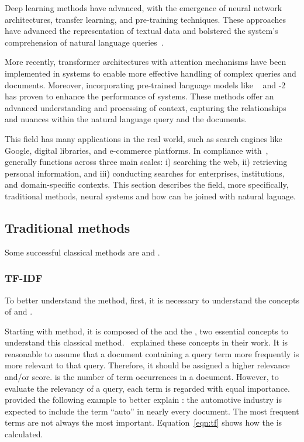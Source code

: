 Deep learning methods have advanced, with the emergence of neural network architectures, transfer learning, and pre-training techniques. These approaches have advanced the representation of textual data and bolstered the {\ir} system's comprehension of natural language queries~\cite{mitra_introduction_nodate}.

More recently, transformer architectures with attention mechanisms have been implemented in {\ir} systems to enable more effective handling of complex queries and documents. Moreover, incorporating pre-trained language models like {\bert}~\cite{devlin_bert_2018} and {\gpt}-2 has proven to enhance the performance of {\ir} systems. These methods offer an advanced understanding and processing of context, capturing the relationships and nuances within the natural language query and the documents.

This field has many applications in the real world, such as search engines like Google, digital libraries, and e-commerce platforms. In compliance with~\citet{p_m_efficient_2021}, {\ir} generally functions across three main scales: i) searching the web, ii) retrieving personal information, and iii) conducting searches for enterprises, institutions, and domain-specific contexts. This section describes the {\ir} field, more specifically, traditional methods, neural {\ir} systems and how {\ir} can be joined with natural laguage.


\subsection{Traditional methods}

Some successful classical methods are {\tfidf} and {\bm}.

\subsubsection{TF-IDF}

To better understand the {\tfidf} method, first, it is necessary to understand the concepts of {\tf} and {\idf}.

Starting with {\tfidf} method, it is composed of the {\tf} and the {\idf}, two essential concepts to understand this classical {\ir} method.~\citet{liang_research_2022} explained these concepts in their work. It is reasonable to assume that a document containing a query term more frequently is more relevant to that query. Therefore, it should be assigned a higher relevance and/or score. {\tf} is the number of term occurrences in a document. However, to evaluate the relevancy of a query, each term is regarded with equal importance.~\citet{manning_introduction_2009} provided the following example to better explain {\tf}: the automotive industry is expected to include the term ``auto'' in nearly every document. The most frequent terms are not always the most important. Equation~\ref{eqn:tf} shows how the {\tf} is calculated.


